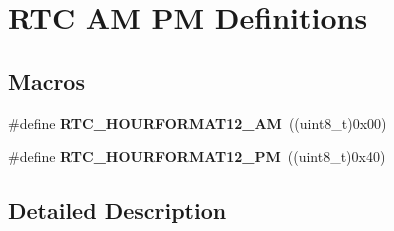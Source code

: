 \hypertarget{group___r_t_c___a_m___p_m___definitions}{}\section{R\+TC AM PM Definitions}
\label{group___r_t_c___a_m___p_m___definitions}
\subsection*{Macros}
\begin{DoxyCompactItemize}
\item 
\#define {\bfseries R\+T\+C\+\_\+\+H\+O\+U\+R\+F\+O\+R\+M\+A\+T12\+\_\+\+AM}~((uint8\+\_\+t)0x00)\hypertarget{group___r_t_c___a_m___p_m___definitions_ga5be28b0dd8d5d12a6b055a70c46ce24a}{}\label{group___r_t_c___a_m___p_m___definitions_ga5be28b0dd8d5d12a6b055a70c46ce24a}

\item 
\#define {\bfseries R\+T\+C\+\_\+\+H\+O\+U\+R\+F\+O\+R\+M\+A\+T12\+\_\+\+PM}~((uint8\+\_\+t)0x40)\hypertarget{group___r_t_c___a_m___p_m___definitions_gae8662cf2f3080b992d3b119f74f60162}{}\label{group___r_t_c___a_m___p_m___definitions_gae8662cf2f3080b992d3b119f74f60162}

\end{DoxyCompactItemize}


\subsection{Detailed Description}
